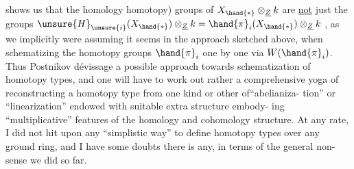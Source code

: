 shows us that the homology \deleted{(=} homotopy) groups of $X_{\hand{\ast}}\otimes_{\underline{Z}}k$ are \uline{not} just
the groups $\unsure{H}_{\unsure{i}}(X_{\hand{\ast}})\otimes_{\underline{Z}}k = \hand{\pi}_i(X_{\hand{\ast}})\otimes_{\underline{Z}}k$ , as we implicitly were assuming it
seems in the approach sketched above, when schematizing the homotopy
groups $\hand{\pi}_i$  one by one via $W(\hand{\pi}_i)$. Thus  Postnikov dévissage  
a possible approach towards schematization of homotopy types, and one
will have to work out rather a comprehensive yoga of reconstructing
a homotopy type from  one kind or other of``abelianiza-%
tion'' or ``linearization''  endowed with suitable extra structure embody-%
ing ``multiplicative'' features of the homology and cohomology structure.
At any rate, I did not hit upon any ``simplistic way'' to define homotopy
types over any ground ring, and I have some doubts there is any, in
terms of the general non-sense  we did so far. 


